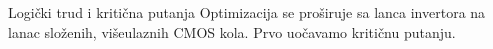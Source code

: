\begin{frame}[label=09_3-s035]{Logički trud i kritična putanja}
Optimizacija se proširuje sa lanca invertora na lanac složenih, višeulaznih CMOS kola. Prvo uočavamo kritičnu putanju.
\begin{center}

\end{center}
\end{frame}
